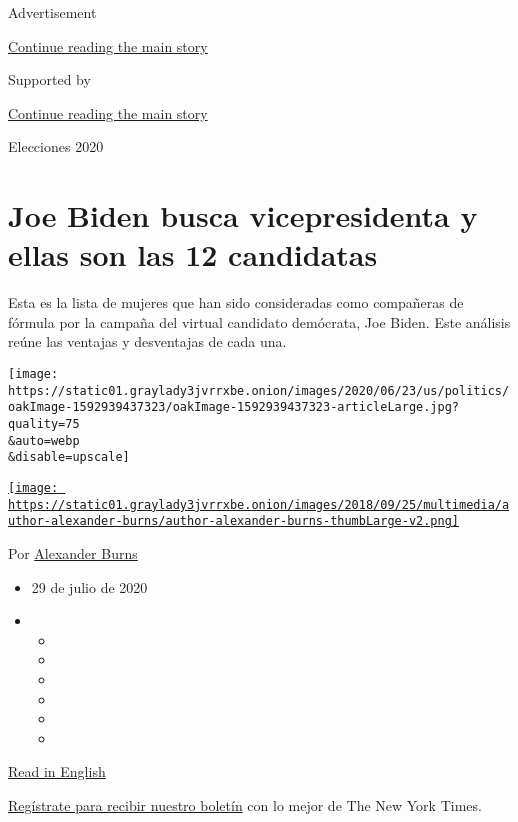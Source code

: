 Advertisement

\protect\hyperlink{after-top}{Continue reading the main story}

Supported by

\protect\hyperlink{after-sponsor}{Continue reading the main story}

Elecciones 2020

\hypertarget{joe-biden-busca-vicepresidenta-y-ellas-son-las-12-candidatas}{%
\section{Joe Biden busca vicepresidenta y ellas son las 12
candidatas}\label{joe-biden-busca-vicepresidenta-y-ellas-son-las-12-candidatas}}

Esta es la lista de mujeres que han sido consideradas como compañeras de
fórmula por la campaña del virtual candidato demócrata, Joe Biden. Este
análisis reúne las ventajas y desventajas de cada una.

\texttt{[image: https://static01.graylady3jvrrxbe.onion/images/2020/06/23/us/politics/oakImage-1592939437323/oakImage-1592939437323-articleLarge.jpg?quality=75\\\&auto=webp\\\&disable=upscale]}

\href{https://www.nytimes3xbfgragh.onion/by/alexander-burns}{\texttt{[image: https://static01.graylady3jvrrxbe.onion/images/2018/09/25/multimedia/author-alexander-burns/author-alexander-burns-thumbLarge-v2.png]}}

Por
\href{https://www.nytimes3xbfgragh.onion/by/alexander-burns}{Alexander
Burns}

\begin{itemize}
\item
  29 de julio de 2020
\item
  \begin{itemize}
  \item
  \item
  \item
  \item
  \item
  \item
  \end{itemize}
\end{itemize}

\href{https://www.nytimes3xbfgragh.onion/article/biden-vice-president-2020.html}{Read
in English}

\href{https://www.nytimes3xbfgragh.onion/newsletters/el-times}{Regístrate
para recibir nuestro boletín} con lo mejor de The New York Times.

